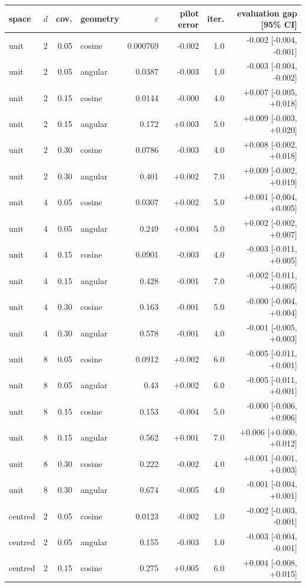 \begin{tabular}{lrrlrrrr}
\toprule
space & $d$ & cov. & geometry & $\varepsilon$ & pilot error & iter. & evaluation gap [95\% CI] \\
\midrule
unit & 2 & 0.05 & cosine & 0.000769 & -0.002 & 1.0 & -0.002 [-0.004, -0.001] \\
unit & 2 & 0.05 & angular & 0.0387 & -0.003 & 1.0 & -0.003 [-0.004, -0.002] \\
unit & 2 & 0.15 & cosine & 0.0144 & -0.000 & 4.0 & +0.007 [-0.005, +0.018] \\
unit & 2 & 0.15 & angular & 0.172 & +0.003 & 5.0 & +0.009 [-0.003, +0.020] \\
unit & 2 & 0.30 & cosine & 0.0786 & -0.003 & 4.0 & +0.008 [-0.002, +0.018] \\
unit & 2 & 0.30 & angular & 0.401 & +0.002 & 7.0 & +0.009 [-0.002, +0.019] \\
unit & 4 & 0.05 & cosine & 0.0307 & +0.002 & 5.0 & +0.001 [-0.004, +0.005] \\
unit & 4 & 0.05 & angular & 0.249 & +0.004 & 5.0 & +0.002 [-0.002, +0.007] \\
unit & 4 & 0.15 & cosine & 0.0901 & -0.003 & 4.0 & -0.003 [-0.011, +0.005] \\
unit & 4 & 0.15 & angular & 0.428 & -0.001 & 7.0 & -0.002 [-0.011, +0.005] \\
unit & 4 & 0.30 & cosine & 0.163 & -0.001 & 5.0 & -0.000 [-0.004, +0.004] \\
unit & 4 & 0.30 & angular & 0.578 & -0.001 & 4.0 & -0.001 [-0.005, +0.003] \\
unit & 8 & 0.05 & cosine & 0.0912 & +0.002 & 6.0 & -0.005 [-0.011, +0.001] \\
unit & 8 & 0.05 & angular & 0.43 & +0.002 & 6.0 & -0.005 [-0.011, +0.001] \\
unit & 8 & 0.15 & cosine & 0.153 & -0.004 & 5.0 & -0.000 [-0.006, +0.006] \\
unit & 8 & 0.15 & angular & 0.562 & +0.001 & 7.0 & +0.006 [+0.000, +0.012] \\
unit & 8 & 0.30 & cosine & 0.222 & -0.002 & 4.0 & +0.001 [-0.001, +0.003] \\
unit & 8 & 0.30 & angular & 0.674 & -0.005 & 4.0 & -0.001 [-0.004, +0.001] \\
centred & 2 & 0.05 & cosine & 0.0123 & -0.002 & 1.0 & -0.002 [-0.003, -0.001] \\
centred & 2 & 0.05 & angular & 0.155 & -0.003 & 1.0 & -0.003 [-0.004, -0.001] \\
centred & 2 & 0.15 & cosine & 0.275 & +0.005 & 6.0 & +0.004 [-0.008, +0.015] \\

\end{tabular}
